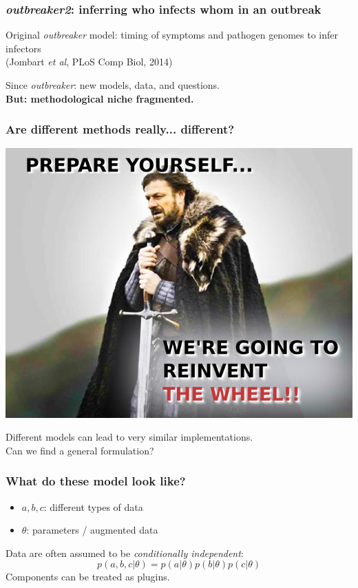 \documentclass[xcolor=svgnames,mathserif]{beamer}
\begin{document}
\begin{frame}[fragile]
  \frametitle{\textit{outbreaker2}: inferring who infects whom in an outbreak}

Original \textit{outbreaker} model: timing of symptoms and pathogen genomes to infer infectors
\\{\tiny (Jombart \textit{et al}, PLoS Comp Biol, 2014)}

\begin{center}


\pause
 Since \textit{outbreaker}: new models, data, and questions.
\pause
~\\
\textbf{\alert{But:} methodological niche fragmented.}
\end{center}

\end{frame}





\begin{frame}[fragile]
  \frametitle{Are different methods really... different?}

\begin{center}

  \pause
  \includegraphics[width=.6\textwidth]{figs/wheel}
    
  \pause
  Different models can lead to very similar implementations.\\
  Can we find a \alert{general formulation}?

\end{center}

\end{frame}





\begin{frame}[fragile]
  \frametitle{What do these model look like?}

\begin{itemize}
\item $a,b,c$: different types of data
\item $\theta$: parameters / augmented data
\end{itemize}

Data are often assumed to be \emph{conditionally independent}:
$$
p(a,b,c | \theta) = p(a|\theta) p(b|\theta) p(c|\theta) 
$$
\pause
Components can be treated as \alert{plugins}.

\end{frame}
\end{document}
